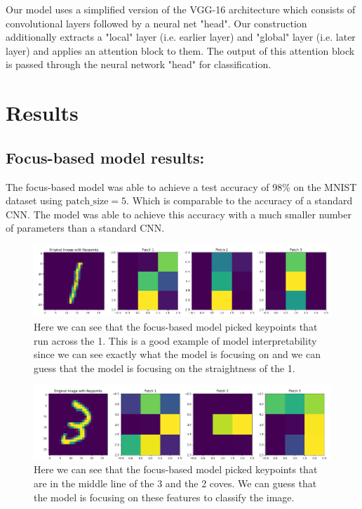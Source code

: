 Our model uses a simplified version of the VGG-16 architecture which consists of convolutional layers followed by a neural net "head". Our construction additionally extracts a "local" layer (i.e. earlier layer) and "global" layer (i.e. later layer) and applies an attention block to them. The output of this attention block is passed through the neural network "head" for classification. 

\section{Results}
\subsection{Focus-based model results:}
The focus-based model was able to achieve a test accuracy of 98\% on the MNIST dataset using \(\text{patch\_size} = 5\). Which is comparable to the accuracy of a standard CNN. The model was able to achieve this accuracy with a much smaller number of parameters than a standard CNN.

\begin{figure}[hbt!]
    \centering
    \includegraphics[scale=0.35]{images/Picture1.png}
    \caption{Here we can see that the focus-based model picked keypoints that run across the 1. This is a good example of model interpretability since we can see exactly what the model is focusing on and we can guess that the model is focusing on the straightness of the 1.}
    \label{fig:focus-1}
\end{figure}

\begin{figure}[hbt!]
    \centering
    \includegraphics[scale=0.35]{images/Picture3.png}
    \caption{Here we can see that the focus-based model picked keypoints that are in the middle line of the 3 and the 2 coves. We can guess that the model is focusing on these features to classify the image.}
    \label{fig:focus-3}
\end{figure}

